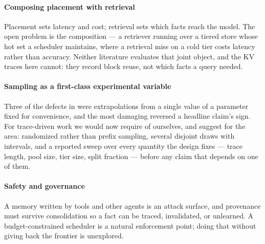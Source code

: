 \paragraph{Composing placement with retrieval}
Placement sets latency and cost; retrieval sets which facts reach the model. The open problem is the
composition --- a retriever running over a tiered store whose hot set a scheduler maintains, where a
retrieval miss on a cold tier costs latency rather than accuracy. Neither literature evaluates that
joint object, and the KV traces here cannot: they record block reuse, not which facts a query needed.

\paragraph{Sampling as a first-class experimental variable}
Three of the defects in  were extrapolations from a single value of a parameter fixed for convenience, and
the most damaging reversed a headline claim's sign. For trace-driven work we would now require of
ourselves, and suggest for the area: randomized rather than prefix sampling, several disjoint draws with
intervals, and a reported sweep over every quantity the design fixes --- trace length, pool size, tier
size, split fraction --- before any claim that depends on one of them.

\paragraph{Safety and governance}
A memory written by tools and other agents is an attack surface, and provenance must survive consolidation
so a fact can be traced, invalidated, or unlearned. A budget-constrained scheduler is a natural
enforcement point; doing that without giving back the frontier is unexplored.
